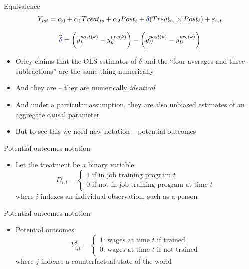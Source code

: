 \documentclass{beamer}
\begin{document}
\begin{frame}{Equivalence}
$$Y_{ist} = \alpha_0 + \alpha_1 Treat_{is} + \alpha_2 Post_{t} + \textcolor{blue}{\delta} (Treat_{is} \times Post_t) + \varepsilon_{ist} $$

\bigskip

$$\widehat{\textcolor{blue}{\delta}} = \bigg ( \overline{y}_k^{post(k)} - \overline{y}_k^{pre(k)} \bigg ) - \bigg ( \overline{y}_U^{post(k)} - \overline{y}_U^{pre(k)} \bigg ) $$

\begin{itemize}
\item Orley claims that the OLS estimator of $\delta$ and the ``four averages and three subtractions'' are the same thing numerically
\item And they are -- they are numerically \emph{identical}
\item And under a particular assumption, they are also unbiased estimates of an aggregate causal parameter
\item But to see this we need new notation -- potential outcomes
\end{itemize}

\end{frame}





\begin{frame}{Potential outcomes notation}
	
	\begin{itemize}
	\item Let the treatment be a binary variable: $$D_{i,t} =\begin{cases} 1 \text{ if in job training program $t$} \\ 0 \text{ if not in job training program at time $t$} \end{cases}$$where $i$ indexes an individual observation, such as a person

	\end{itemize}
\end{frame}

\begin{frame}{Potential outcomes notation}
	
	\begin{itemize}

	\item Potential outcomes: $$Y_{i,t}^j =\begin{cases} 1 \text{: wages at time $t$ if trained} \\ 0 \text{: wages at time $t$ if not trained} \end{cases}$$where $j$ indexes a counterfactual state of the world

	\end{itemize}
\end{frame}
\end{document}
